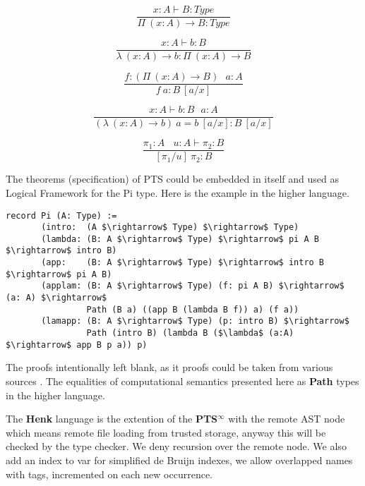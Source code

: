 \documentclass{article}
\begin{document}
\begin{equation}
\tag{$\Pi$-formation}
\dfrac
{x:A \vdash B : Type}
{\Pi\ (x:A) \rightarrow B : Type}
\end{equation}

\begin{equation}
\tag{$\lambda$-intro}
\dfrac
{x:A \vdash b : B}
{\lambda\ (x:A) \rightarrow b : \Pi\ (x: A) \rightarrow B }
\end{equation}

\begin{equation}
\tag{$App$-elimination}
\dfrac
{f: (\Pi\ (x:A) \rightarrow B)\ \ \ a: A}
{f\ a : B\ [a/x]}
\end{equation}

\begin{equation}
\tag{$\beta$-computation}
\dfrac
{x:A \vdash b: B\ \ \ a:A}
{(\lambda\ (x:A) \rightarrow b)\ a = b\ [a/x] : B\ [a/x]}
\end{equation}

\begin{equation}
\tag{subst}
\dfrac
{\pi_1 : A\ \ \ \ u:A \vdash \pi_2 : B}
{[\pi_1/u]\ \pi_2 : B}
\end{equation}

The theorems (specification) of PTS could be embedded in itself and used as
Logical Framework for the Pi type. Here is the example in the higher language.

\begin{lstlisting}[mathescape=true]
record Pi (A: Type) :=
       (intro:  (A $\rightarrow$ Type) $\rightarrow$ Type)
       (lambda: (B: A $\rightarrow$ Type) $\rightarrow$ pi A B $\rightarrow$ intro B)
       (app:    (B: A $\rightarrow$ Type) $\rightarrow$ intro B $\rightarrow$ pi A B)
       (applam: (B: A $\rightarrow$ Type) (f: pi A B) $\rightarrow$ (a: A) $\rightarrow$
                Path (B a) ((app B (lambda B f)) a) (f a))
       (lamapp: (B: A $\rightarrow$ Type) (p: intro B) $\rightarrow$
                Path (intro B) (lambda B ($\lambda$ (a:A) $\rightarrow$ app B p a)) p)
\end{lstlisting}

The proofs intentionally left blank, as it proofs could be taken from various sources \cite{Henk93}.
The equalities of computational semantics presented here as {\bf Path} types in the higher language.

The {\bf Henk} language is the extention of the {\bf PTS$^\infty$} with the remote AST node which means remote file loading from trusted storage, anyway this will be checked by the type checker.
We deny recursion over the remote node.
We also add an index to var for simplified de Bruijn indexes, we allow overlapped names with tags, incremented on each new occurrence.
\end{document}
